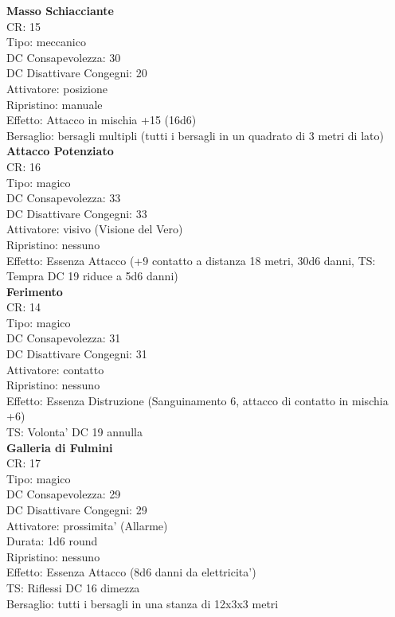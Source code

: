 \documentclass[a4paper,11pt,twoside,openany]{book}
\begin{document}
{\begin{multicols}{2}
			\textbf{Masso Schiacciante}\\
			CR: 15 \\
			Tipo: meccanico \\
			DC Consapevolezza: 30 \\
			DC Disattivare Congegni: 20 \\
			Attivatore: posizione \\
			Ripristino: manuale \\
			Effetto: Attacco in mischia +15 (16d6) \\
			Bersaglio: bersagli multipli (tutti i bersagli in un quadrato di 3 metri di lato)\\
			
			\textbf{Attacco Potenziato}\\
			CR: 16 \\
			Tipo: magico \\
			DC Consapevolezza: 33 \\
			DC Disattivare Congegni: 33 \\
			Attivatore: visivo (Visione del Vero) \\
			Ripristino: nessuno \\
			Effetto: Essenza Attacco (+9 contatto a distanza 18 metri, 30d6 danni, TS: Tempra DC 19 riduce a 5d6 danni)\\
			
			\textbf{Ferimento}\\
			CR: 14 \\
			Tipo: magico \\
			DC Consapevolezza: 31 \\
			DC Disattivare Congegni: 31 \\
			Attivatore: contatto \\
			Ripristino: nessuno \\
			Effetto: Essenza Distruzione (Sanguinamento 6, attacco di contatto in mischia +6)\\
			TS: Volonta' DC 19 annulla\\
			
			\textbf{Galleria di Fulmini}\\
			CR: 17 \\
			Tipo: magico \\
			DC Consapevolezza: 29 \\
			DC Disattivare Congegni: 29 \\
			Attivatore: prossimita' (Allarme) \\
			Durata: 1d6 round \\
			Ripristino: nessuno \\
			Effetto: Essenza Attacco (8d6 danni da elettricita') \\
			TS: Riflessi DC 16 dimezza \\
			Bersaglio: tutti i bersagli in una stanza di 12x3x3 metri\\
			

\end{multicols}}
\end{document}
